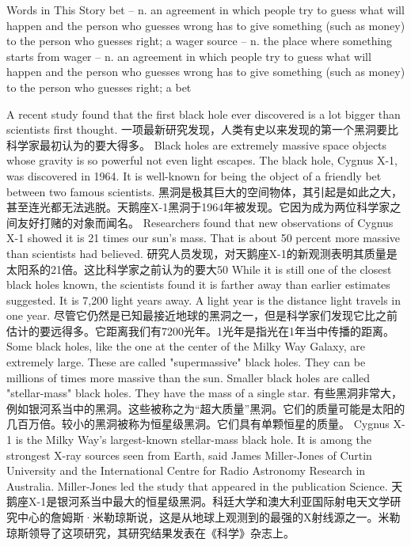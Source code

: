 \begin{messagebox}
Words in This Story
bet – n. an agreement in which people try to guess what will happen and the person who guesses wrong has to give something (such as money) to the person who guesses right; a wager
source – n. the place where something starts from
wager – n. an agreement in which people try to guess what will happen and the person who guesses wrong has to give something (such as money) to the person who guesses right; a bet
\end{messagebox}

A recent study found that the first black hole ever discovered is a lot bigger than scientists first thought.
一项最新研究发现，人类有史以来发现的第一个黑洞要比科学家最初认为的要大得多。
Black holes are extremely massive space objects whose gravity is so powerful not even light escapes. The black hole, Cygnus X-1, was discovered in 1964. It is well-known for being the object of a friendly bet between two famous scientists.
黑洞是极其巨大的空间物体，其引起是如此之大，甚至连光都无法逃脱。天鹅座X-1黑洞于1964年被发现。它因为成为两位科学家之间友好打赌的对象而闻名。
Researchers found that new observations of Cygnus X-1 showed it is 21 times our sun's mass. That is about 50 percent more massive than scientists had believed.
研究人员发现，对天鹅座X-1的新观测表明其质量是太阳系的21倍。这比科学家之前认为的要大50%
While it is still one of the closest black holes known, the scientists found it is farther away than earlier estimates suggested. It is 7,200 light years away. A light year is the distance light travels in one year.
尽管它仍然是已知最接近地球的黑洞之一，但是科学家们发现它比之前估计的要远得多。它距离我们有7200光年。1光年是指光在1年当中传播的距离。
Some black holes, like the one at the center of the Milky Way Galaxy, are extremely large. These are called "supermassive" black holes. They can be millions of times more massive than the sun. Smaller black holes are called "stellar-mass" black holes. They have the mass of a single star.
有些黑洞非常大，例如银河系当中的黑洞。这些被称之为“超大质量”黑洞。它们的质量可能是太阳的几百万倍。较小的黑洞被称为恒星级黑洞。它们具有单颗恒星的质量。
Cygnus X-1 is the Milky Way's largest-known stellar-mass black hole. It is among the strongest X-ray sources seen from Earth, said James Miller-Jones of Curtin University and the International Centre for Radio Astronomy Research in Australia. Miller-Jones led the study that appeared in the publication Science.
天鹅座X-1是银河系当中最大的恒星级黑洞。科廷大学和澳大利亚国际射电天文学研究中心的詹姆斯·米勒琼斯说，这是从地球上观测到的最强的X射线源之一。米勒琼斯领导了这项研究，其研究结果发表在《科学》杂志上。
